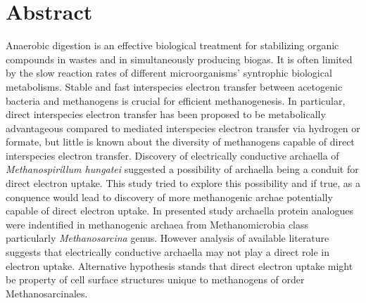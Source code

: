 \documentclass[fontsize=12pt,headsepline=true, bibliography=totocnumbered, twoside]{scrbook} %
\begin{document}
\chapter*{Abstract} %


Anaerobic digestion is an effective biological treatment for stabilizing organic compounds in wastes and in simultaneously producing biogas. It is often limited by the slow reaction rates of different microorganisms’ syntrophic biological metabolisms. Stable and fast interspecies electron transfer between acetogenic bacteria and methanogens is crucial for efficient methanogenesis. In particular, direct interspecies electron transfer has been proposed to be metabolically advantageous compared to mediated interspecies electron transfer via hydrogen or formate, but little is known about the diversity of methanogens capable of direct interspecies electron transfer. Discovery of electrically conductive archaella of \textit{Methanospirillum hungatei} suggested a possibility of archaella being a conduit for direct electron uptake. This study tried to explore this possibility and if true, as a conquence would lead to discovery of more methanogenic archae potentially capable of direct electron uptake.  In presented study archaella protein analogues were indentified in methanogenic archaea from Methanomicrobia class particularly \textit{Methanosarcina} genus. However analysis of available literature suggests that electrically conductive archaella may not play a direct role in electron uptake. Alternative hypothesis stands that direct electron uptake might be property of cell surface structures unique to methanogens of order Methanosarcinales.







\tableofcontents %

\listoffigures   %

\listoftables    %


\end{document}
